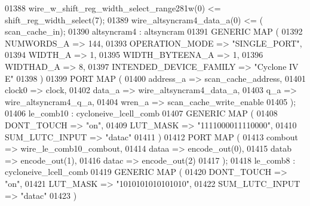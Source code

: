 \begin{DoxyCode}
{01388     \textcolor{vhdlchar}{wire_w_shift_reg_width_select_range281w}\textcolor{vhdlchar}{(}\textcolor{vhdllogic}{}\textcolor{vhdllogic}{0}\textcolor{vhdlchar}{)} \textcolor{vhdlchar}{<=} \textcolor{vhdlchar}{shift_reg_width_select}\textcolor{vhdlchar}{(}\textcolor{vhdllogic}{}\textcolor{vhdllogic}{7}\textcolor{vhdlchar}{)};
01389     \textcolor{vhdlchar}{wire_altsyncram4_data_a}\textcolor{vhdlchar}{(}\textcolor{vhdllogic}{}\textcolor{vhdllogic}{0}\textcolor{vhdlchar}{)} \textcolor{vhdlchar}{<=} \textcolor{vhdlchar}{(} \textcolor{vhdlchar}{scan_cache_in}\textcolor{vhdlchar}{)};
01390     altsyncram4 :  altsyncram
01391       \textcolor{keywordflow}{GENERIC} \textcolor{keywordflow}{MAP} (
01392         NUMWORDS\_A => \textcolor{vhdllogic}{144},
01393         OPERATION\_MODE => \textcolor{keyword}{"SINGLE\_PORT"},
01394         WIDTH\_A => \textcolor{vhdllogic}{1},
01395         WIDTH\_BYTEENA\_A => \textcolor{vhdllogic}{1},
01396         WIDTHAD\_A => \textcolor{vhdllogic}{8},
01397         INTENDED\_DEVICE\_FAMILY => \textcolor{keyword}{"Cyclone IV E"}  
01398       \textcolor{vhdlchar}{)}
01399       \textcolor{keywordflow}{PORT} \textcolor{keywordflow}{MAP} ( 
01400         address\_a => scan_cache_address,
01401         clock0 => clock,
01402         data\_a => wire_altsyncram4_data_a,
01403         q\_a => wire_altsyncram4_q_a,
01404         wren\_a => scan_cache_write_enable
01405       \textcolor{vhdlchar}{)};
01406     le_comb10 :  cycloneive\_lcell\_comb
01407       \textcolor{keywordflow}{GENERIC} \textcolor{keywordflow}{MAP} (
01408         DONT\_TOUCH => \textcolor{keyword}{"on"},
01409         LUT\_MASK => "\textcolor{vhdllogic}{1111000011110000}",
01410         SUM\_LUTC\_INPUT => \textcolor{keyword}{"datac"}
01411       \textcolor{vhdlchar}{)}
01412       \textcolor{keywordflow}{PORT} \textcolor{keywordflow}{MAP} ( 
01413         combout => wire_le_comb10_combout,
01414         dataa => encode_out\textcolor{vhdlchar}{(}\textcolor{vhdllogic}{0}\textcolor{vhdlchar}{)},
01415         datab => encode_out\textcolor{vhdlchar}{(}\textcolor{vhdllogic}{1}\textcolor{vhdlchar}{)},
01416         datac => encode_out\textcolor{vhdlchar}{(}\textcolor{vhdllogic}{2}\textcolor{vhdlchar}{)}
01417       \textcolor{vhdlchar}{)};
01418     le_comb8 :  cycloneive\_lcell\_comb
01419       \textcolor{keywordflow}{GENERIC} \textcolor{keywordflow}{MAP} (
01420         DONT\_TOUCH => \textcolor{keyword}{"on"},
01421         LUT\_MASK => "\textcolor{vhdllogic}{1010101010101010}",
01422         SUM\_LUTC\_INPUT => \textcolor{keyword}{"datac"}
01423       \textcolor{vhdlchar}{)}
}
\end{DoxyCode}
